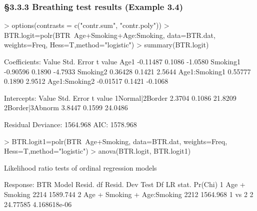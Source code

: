 \documentclass{beamer}
\begin{document}
%
% 
%
%


\begin{frame}[fragile] \frametitle{\S3.3.3 Breathing test results  (Example 3.4)}
\begin{tiny}
\begin{Schunk}
\begin{Sinput}
> options(contrasts = c("contr.sum", "contr.poly"))
> BTR.logit=polr(BTR~Age+Smoking+Age:Smoking, data=BTR.dat, weights=Freq, Hess=T,method="logistic")
> summary(BTR.logit)
\end{Sinput} 
\begin{Soutput}
Coefficients:
                 Value Std. Error t value
Age1          -0.11487     0.1086 -1.0580
Smoking1      -0.90596     0.1890 -4.7933
Smoking2       0.36428     0.1421  2.5644
Age1:Smoking1  0.55777     0.1890  2.9512
Age1:Smoking2 -0.01517     0.1421 -0.1068

Intercepts:
                Value   Std. Error t value
1Normal|2Border  2.3704  0.1086    21.8209
2Border|3Abnorm  3.8447  0.1599    24.0486

Residual Deviance: 1564.968 
AIC: 1578.968 
\end{Soutput}
\begin{Sinput}
> BTR.logit1=polr(BTR~Age+Smoking, data=BTR.dat, weights=Freq, Hess=T,method="logistic")
> anova(BTR.logit, BTR.logit1)
\end{Sinput} 
\begin{Soutput}
Likelihood ratio tests of ordinal regression models

Response: BTR
                        Model Resid. df Resid. Dev   Test    Df LR stat.      Pr(Chi)
1               Age + Smoking      2214   1589.744                                   
2 Age + Smoking + Age:Smoking      2212   1564.968 1 vs 2     2 24.77585 4.168618e-06
\end{Soutput}
\end{Schunk}
\end{tiny}
\end{frame}
\end{document}
